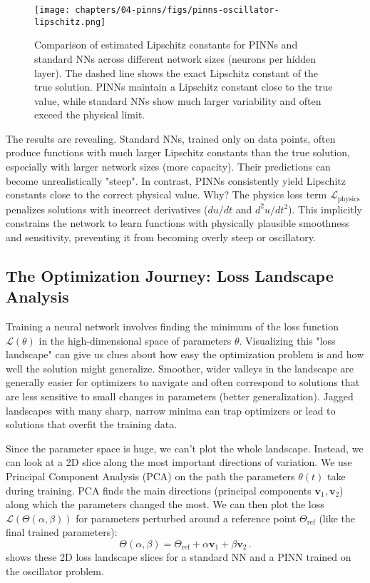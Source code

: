 \begin{figure}[htbp] %
    \centering
    \texttt{[image: chapters/04-pinns/figs/pinns-oscillator-lipschitz.png]}
    \caption{Comparison of estimated Lipschitz constants for PINNs and standard NNs across different network sizes (neurons per hidden layer). The dashed line shows the exact Lipschitz constant of the true solution. PINNs maintain a Lipschitz constant close to the true value, while standard NNs show much larger variability and often exceed the physical limit.}
    \label{fig:lipschitz}
\end{figure}

The results are revealing. Standard NNs, trained only on data points, often produce functions with much larger Lipschitz constants than the true solution, especially with larger network sizes (more capacity). Their predictions can become unrealistically "steep". In contrast, PINNs consistently yield Lipschitz constants close to the correct physical value. Why? The physics loss term $\mathcal{L}_{\text{physics}}$ penalizes solutions with incorrect derivatives ($du/dt$ and $d^2u/dt^2$). This implicitly constrains the network to learn functions with physically plausible smoothness and sensitivity, preventing it from becoming overly steep or oscillatory.

\subsection{The Optimization Journey: Loss Landscape Analysis}

Training a neural network involves finding the minimum of the loss function $\mathcal{L}(\theta)$ in the high-dimensional space of parameters $\theta$. Visualizing this "loss landscape" can give us clues about how easy the optimization problem is and how well the solution might generalize. Smoother, wider valleys in the landscape are generally easier for optimizers to navigate and often correspond to solutions that are less sensitive to small changes in parameters (better generalization). Jagged landscapes with many sharp, narrow minima can trap optimizers or lead to solutions that overfit the training data.

Since the parameter space is huge, we can't plot the whole landscape. Instead, we can look at a 2D slice along the most important directions of variation. We use Principal Component Analysis (PCA) on the path the parameters $\theta(t)$ take during training. PCA finds the main directions (principal components $\mathbf{v}_1, \mathbf{v}_2$) along which the parameters changed the most. We can then plot the loss $\mathcal{L}(\Theta(\alpha, \beta))$ for parameters perturbed around a reference point $\Theta_{\text{ref}}$ (like the final trained parameters):
%
\[
\Theta(\alpha, \beta) = \Theta_{\text{ref}} + \alpha \mathbf{v}_1 + \beta \mathbf{v}_2\,.
\]
%
 shows these 2D loss landscape slices for a standard NN and a PINN trained on the oscillator problem.

